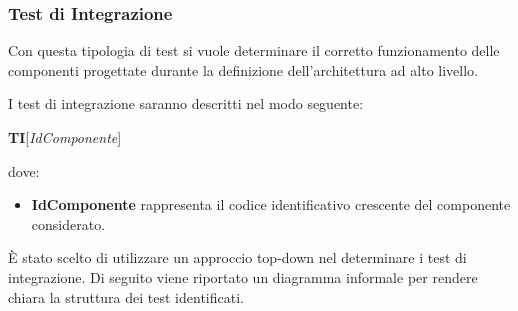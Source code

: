 \subsubsection{Test di Integrazione}
Con questa tipologia di test si vuole determinare il corretto funzionamento delle componenti progettate durante la definizione dell'architettura ad alto livello.

I test di integrazione saranno descritti nel modo seguente:
\begin{center}
\textbf{TI}[\textit{IdComponente}]
\end{center}
dove:
\begin{itemize}
\item
\textbf{IdComponente} rappresenta il codice identificativo crescente del componente considerato.
\end{itemize}
È stato scelto di utilizzare un approccio top-down nel determinare i test di integrazione. Di seguito viene riportato un diagramma informale per rendere chiara la struttura dei test identificati.


